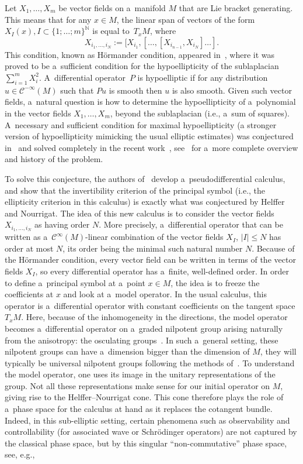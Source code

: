 \documentclass[pdftex]{sigma}
\newcommand{\N}{\mathbb N} %
\newcommand{\CCC}{\mathscr{C}} %
\numberwithin{equation}{section}
\theoremstyle{definition}
\begin{document}
Let $X_1, \dots, X_m$ be vector fields on a~manifold $M$ that are Lie bracket generating. This means that for any $x \in M$, the linear span of vectors of the form $X_I(x), I\subset \{1;\dots;m\}^{\N}$ is equal to~$T_xM$, where
\[X_{i_1,\dots,i_N} := [X_{i_1},[\dots,[X_{i_{n-1}},X_{i_N}]\dots].
\]
This condition, known as H\"ormander condition, appeared in~\cite{Hormander}, where it was proved to be a~sufficient condition for the hypoellipticity of the sublaplacian $\sum_{i=1}^m X_i^2$. A~differential operator~$P$ is hypoelliptic if for any distribution $u \in \CCC^{-\infty}(M)$ such that $Pu$ is smooth then $u$ is also smooth.
Given such vector fields, a~natural question is how to determine the hypoellipticity of a~polynomial in the vector fields $X_1, \dots, X_m$, beyond the sublaplacian (i.e., a~sum of squares). A~necessary and sufficient condition for maximal hypoellipticity (a stronger version of hypoellipticity mimicking the usual elliptic estimates) was conjectured in~\cite{HelfferNourrigatPaper} and solved completely in the recent work~\cite{AMYMaximalHypoellipticity}, see~\cite{DebordBourbaki,HelfferNourrigatBook} for a~more complete overview and history of the problem.

To solve this conjecture, the authors of~\cite{AMYMaximalHypoellipticity} develop a~pseudodifferential calculus, and show that the invertibility criterion of the principal symbol (i.e., the ellipticity criterion in this calculus) is exactly what was conjectured by Helffer and Nourrigat. The idea of this new calculus is to consider the vector fields $X_{i_1,\dots,i_N}$ as having order $N$. More precisely, a~differential operator that can be written as a~$\CCC^{\infty}(M)$-linear combination of the vector fields $X_{I}$, $|I|\leq N$ has order at most $N$, its order being the minimal such natural number $N$. Because of the H\"ormander condition, every vector field can be written in terms of the vector fields $X_I$, so every differential operator has a~finite, well-defined order. In order to define a~principal symbol at a~point $x\in M$, the idea is to freeze the coefficients at $x$ and look at a~model operator. In the usual calculus, this operator is a~differential operator with constant coefficients on the tangent space $T_xM$. Here, because of the inhomogeneity in the directions, the model operator becomes a~differential operator on a~graded nilpotent group arising naturally from the anisotropy: the osculating groups~\cite{AMYMaximalHypoellipticity,RothschildStein}. In such a~general setting, these nilpotent groups can have a~dimension bigger than the dimension of $M$, they will typically be universal nilpotent groups following the methods of~\cite{RothschildStein}. To understand the model operator, one uses its image in the unitary representations of the group. Not all these representations make sense for our initial operator on $M$, giving rise to the Helffer--Nourrigat cone. This cone therefore plays the role of a~phase space for the calculus at hand as it replaces the cotangent bundle. Indeed, in this sub-elliptic setting, certain phenomena such as observability and controllability (for associated wave or Schr\"odinger operators) are not captured by the classical phase space, but by this singular ``non-commutative'' phase space, see, e.g., \cite{FermanianLetrouit,Letrouit}
\end{document}
